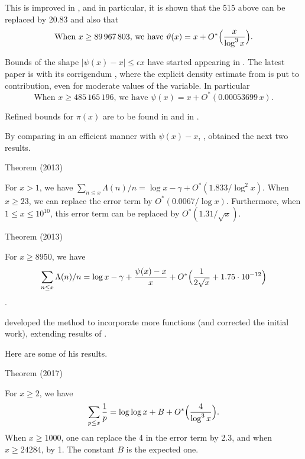 This is improved in
\cite{Dusart*16},
and in particular, it is shown that the 515 above can be replaced by
20.83 and also that
$$
\text{When $x\ge 89\,967\,803$, we have } \vartheta(x)=x+O^*\Bigl(\frac{x}{\log^3
x}\Bigr).
$$

Bounds of the shape $|\psi(x)-x|\le \epsilon x$ have started appearing
in
\cite{Rosser-Schoenfeld*62}.
The latest paper is
\cite{Kadiri-Faber*13}
with its corrigendum
\cite{Kadiri-Faber*18},
where the explicit density estimate from
\cite{Kadiri*13}
is put to contribution, even for moderate
values of the variable. In particular
$$
\text{When $x\ge 485\,165\,196$, we have } \psi(x)=x+O^*(0.00053699\,x).
$$

Refined bounds for $\pi(x)$ are to be found in
\cite{Panaitopol*00}
and in
\cite{Axler*16}.



By comparing in an efficient manner with $\psi(x)-x$,
\cite{Ramare*12-1},
obtained the next two results.

\par 
\begin{thm}{Theorem (2013)}

  For $x > 1$, we have
  $\sum_{n\le x}\Lambda(n)/n=\log x-\gamma+O^*(1.833/\log^2x)$.
  When $x\ge 23$, we can replace the error term by $O^*(0.0067/\log
  x)$.
  Furthermore, when $1\le x\le 10^{10}$, this error term can be
  replaced by $O^*(1.31/\sqrt{x})$. 
\end{thm}


\par 
\begin{thm}{Theorem (2013)}

  For $x\ge 8950$, we have
  $$
  \sum_{n\le x}\Lambda(n)/n=\log x-\gamma
  +\frac{\psi(x)-x}{x}+O^*\Bigl(\frac{1}{2\sqrt{x}}+1.75\cdot 10^{-12}\Bigl)
  $$.
\end{thm}



\cite{Vanlalnagaia*15-1}
developed the method to incorporate more functions (and corrected the
initial work), extending results of
\cite{Rosser-Schoenfeld*62}.

Here are some of his results.

\par 
\begin{thm}{Theorem (2017)}

  For $x\ge 2$, we have
  $$
  \sum_{p\le x}\frac1p=\log\log  x+B+O^*\Bigl(\frac{4}{\log^3x}\Bigr).
  $$
  When $x\ge 1000$, one can replace the 4 in the error term by 2.3,
  and when $x\ge24284$, by 1. The constant $B$ is the expected one.
\end{thm}



